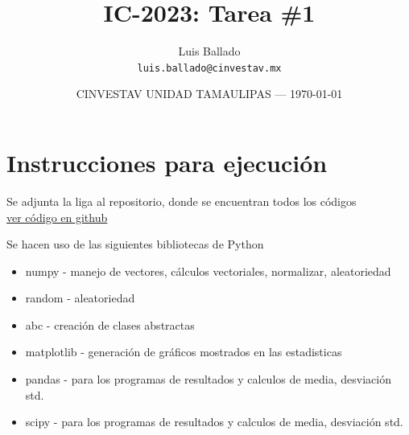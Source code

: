 \documentclass{article}
\title{IC-2023: Tarea \#1} %
\author{Luis Ballado\\ \texttt{luis.ballado@cinvestav.mx}} %
\date{CINVESTAV UNIDAD TAMAULIPAS --- \today} %
\begin{document}
\maketitle %


\section{Instrucciones para ejecución}

\begin{info} %
  Se adjunta la liga al repositorio, donde se encuentran todos los códigos\\
  \href{https://github.com/luisballado/InteligenciaComputacional/tree/master/code/tarea1}{ver código en github}\\
\end{info}

\begin{info} %
  Se hacen uso de las siguientes bibliotecas de Python
  \begin{itemize}
  \item numpy  - manejo de vectores, cálculos vectoriales, normalizar, aleatoriedad
  \item random - aleatoriedad
  \item abc - creación de clases abstractas
  \item matplotlib - generación de gráficos mostrados en las estadisticas
  \item pandas - para los programas de resultados y calculos de media, desviación std.
  \item scipy - para los programas de resultados y calculos de media, desviación std. 
  \end{itemize}
\end{info}
\end{document}
